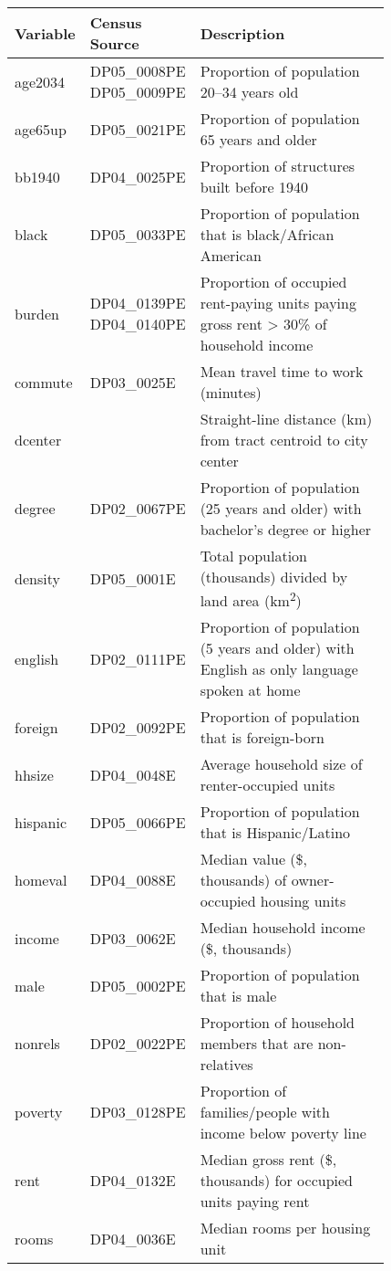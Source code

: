 \begin{tabular}{l p{0.15\linewidth} p{0.675\linewidth}}
\toprule
Variable & Census Source & Description \\
\midrule
age2034  & DP05\_0008PE DP05\_0009PE & Proportion of population 20--34 years old\\
age65up  & DP05\_0021PE & Proportion of population 65 years and older\\
bb1940   & DP04\_0025PE & Proportion of structures built before 1940\\
black    & DP05\_0033PE & Proportion of population that is black/African American\\
burden   & DP04\_0139PE DP04\_0140PE & Proportion of occupied rent-paying units paying gross rent > 30\% of household income\\
commute  & DP03\_0025E  & Mean travel time to work (minutes)\\
dcenter  &              & Straight-line distance (km) from tract centroid to city center\\
degree   & DP02\_0067PE & Proportion of population (25 years and older) with bachelor's degree or higher\\
density  & DP05\_0001E  & Total population (thousands) divided by land area (km\textsuperscript{2})\\
english  & DP02\_0111PE & Proportion of population (5 years and older) with English as only language spoken at home\\
foreign  & DP02\_0092PE & Proportion of population that is foreign-born\\
hhsize   & DP04\_0048E  & Average household size of renter-occupied units\\
hispanic & DP05\_0066PE & Proportion of population that is Hispanic/Latino\\
homeval  & DP04\_0088E  & Median value (\$, thousands) of owner-occupied housing units\\
income   & DP03\_0062E  & Median household income (\$, thousands)\\
male     & DP05\_0002PE & Proportion of population that is male\\
nonrels  & DP02\_0022PE & Proportion of household members that are non-relatives\\
poverty  & DP03\_0128PE & Proportion of families/people with income below poverty line\\
rent     & DP04\_0132E  & Median gross rent (\$, thousands) for occupied units paying rent\\
rooms    & DP04\_0036E  & Median rooms per housing unit\\

\end{tabular}
